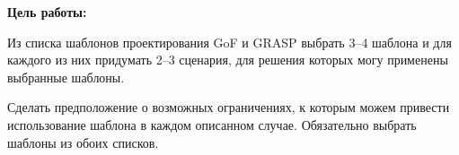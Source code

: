 \textbf{Цель работы:}

Из списка шаблонов проектирования GoF и GRASP выбрать 3--4 шаблона и для каждого из них придумать 2--3 сценария,
для решения которых могу применены выбранные шаблоны.

Сделать предположение о возможных ограничениях,
к которым можем привести использование шаблона в каждом описанном случае.
Обязательно выбрать шаблоны из обоих списков.
